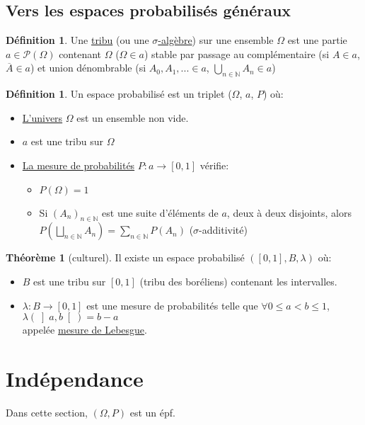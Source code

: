 \documentclass[10pt,a4paper]{article}
\theoremstyle{definition}
\newtheorem{theorem}[proposition]{Théorème}
\newtheorem{definition}[proposition]{Définition}
\begin{document}
\subsection{Vers les espaces probabilisés généraux}
\begin{definition}
Une \uline{tribu} (ou une \uline{$\sigma$-algèbre}) sur une ensemble $\Omega$ est une partie $a \in \mathcal{P}(\Omega)$ contenant $\Omega$ ($\Omega \in a$) stable par passage au complémentaire (si $A \in a$, $\overline{A} \in a$) et union dénombrable (si $A_0, A_1, ... \in a$, $\bigcup\limits_{n \in \mathbb{N}} A_n \in a$)
\end{definition}
\begin{definition}
Un espace probabilisé est un triplet ($\Omega$, $a$, $P$) où:
\begin{itemize}
\item \uline{L'univers} $\Omega$ est un ensemble non vide.
\item $a$ est une tribu sur $\Omega$
\item \uline{La mesure de probabilités} $P: a \to [0, 1]$ vérifie:
\begin{itemize}
\item $P(\Omega) = 1$
\item Si $(A_n)_{n \in \mathbb{N}}$ est une suite d'éléments de $a$, deux à deux disjoints, alors $P\left( \bigsqcup\limits_{n \in \mathbb{N}} A_n \right) = \sum\limits_{n \in \mathbb{N}} P(A_n)$ ($\sigma$-additivité)
\end{itemize}
\end{itemize}
\end{definition}
\begin{theorem}[culturel]
Il existe un espace probabilisé $([0, 1], B, \lambda)$ où:
\begin{itemize}
\item $B$ est une tribu sur $[0, 1]$ (tribu des boréliens) contenant les intervalles.
\item $\lambda: B \to [0, 1]$ est une mesure de probabilités telle que $\forall 0 \leq a < b \leq 1$, $\lambda(\left] a, b \right[) = b - a$ \\
appelée \uline{mesure de Lebesgue}.
\end{itemize}
\end{theorem}

\section{Indépendance}
Dans cette section, $(\Omega, P)$ est un épf.
\end{document}
